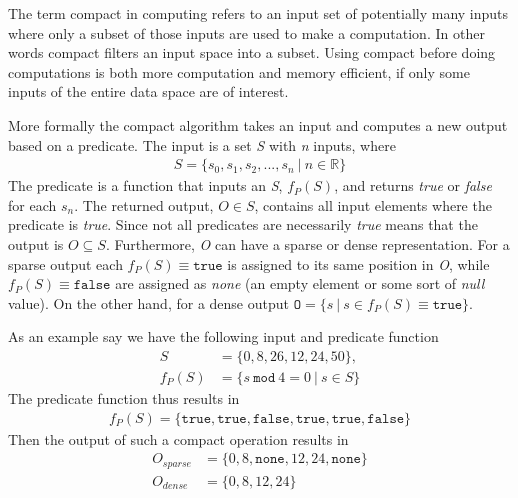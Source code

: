 The term compact in computing refers to an input set of potentially many inputs where only a subset of those inputs are used to make a computation.
In other words compact filters an input space into a subset.
Using compact before doing computations is both more computation and memory efficient, if only some inputs of the entire data space are of interest.

More formally the compact algorithm takes an input and computes a new output based on a predicate.
The input is a set \textit{S} with \textit{n} inputs, where 
\begin{gather}
	S=\{s_{0}, s_{1}, s_{2}, ... , s_{n}\ |\ n\in \mathbb{R}\}
\end{gather}
The predicate is a function that inputs an \textit{S}, $f_{P}(S)$, and returns \textit{true} or \textit{false} for each $s_n$.
The returned output, $O\in S$, contains all input elements where the predicate is \textit{true}. 
Since not all predicates are necessarily \textit{true} means that the output is $O\subseteq S$.
Furthermore, \textit{O} can have a sparse or dense representation.
For a sparse output each $f_{P}(S)\equiv \mathtt{true}$ is assigned to its same position in \textit{O}, while $f_{P}(S)\equiv \mathtt{false}$ are assigned as \textit{none} (an empty element or some sort of \textit{null} value).
On the other hand, for a dense output $\mathtt{O}=\{s\ |\ s\in f_{P}(S)\equiv \mathtt{true}\}$.

As an example say we have the following input and predicate function
\begin{align}
	       S &= \{0, 8, 26, 12, 24, 50\}, \\
	f_{P}(S) &= \{s\ \mathtt{mod}\ 4 = 0\ |\ s\in S\}
\end{align}
The predicate function thus results in
\begin{gather}
	f_{P}(S)=\{\mathtt{true}, \mathtt{true}, \mathtt{false}, \mathtt{true}, \mathtt{true}, \mathtt{false}\}
\end{gather}
Then the output of such a compact operation results in
\begin{align}
	O_{sparse} &= \{0, 8, \mathtt{none}, 12, 24, \mathtt{none}\}\\
	O_{dense} &= \{0, 8, 12, 24\}
\end{align}

